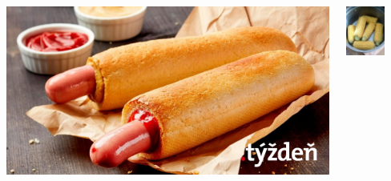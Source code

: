 \documentclass{beamer}
\begin{document}
\begin{frame}
		\begin{columns}
		\begin{column}{0.5\textwidth}
		\includegraphics[width=\textwidth]{day4/parok}
		\end{column}
		\begin{column}{0.5\textwidth}
		\centering
		\includegraphics[width=0.6\textwidth]{day4/kukurica}
		\end{column}
		\end{columns}
	\end{frame}
\end{document}
